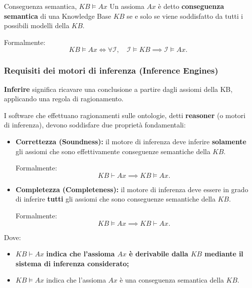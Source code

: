 \begin{definition}{Conseguenza semantica, $KB \models Ax$ }
    Un assioma $Ax$ è detto \textbf{conseguenza semantica} di una
    Knowledge Base $KB$ se e solo se viene soddisfatto da tutti
    i possibili modelli della $KB$.

    Formalmente:
    \[
        KB \models Ax
        \iff
        \forall \mathcal{I}, \quad
        \mathcal{I} \models KB
        \implies
        \mathcal{I} \models Ax.
    \]
\end{definition}


\newpage
\subsubsection{Requisiti dei motori di inferenza (Inference Engines)}

\begin{observation}{}
\textbf{Inferire} significa ricavare una conclusione a partire dagli assiomi della KB, applicando una
regola di ragionamento.
\end{observation}

I software che effettuano ragionamenti sulle ontologie, detti
\textbf{reasoner} (o motori di inferenza), devono soddisfare due
proprietà fondamentali:

\begin{itemize}
    \item \textbf{Correttezza (Soundness):} il motore di inferenza
    deve inferire \textbf{solamente} gli assiomi che sono
    effettivamente conseguenze semantiche della $KB$.

    Formalmente:
    \[
        KB \vdash Ax \implies KB \models Ax.
    \]

    \item \textbf{Completezza (Completeness):} il motore di inferenza
    deve essere in grado di inferire \textbf{tutti} gli assiomi
    che sono conseguenze semantiche della $KB$.

    Formalmente:
    \[
        KB \models Ax \implies KB \vdash Ax.
    \]
\end{itemize}

Dove:
\begin{itemize}
    \item $KB \vdash Ax$ \textbf{indica che l'assioma $Ax$ è derivabile
    dalla $KB$ mediante il sistema di inferenza considerato;}
    \item $KB \models Ax$ indica che l'assioma $Ax$ è una
    conseguenza semantica della $KB$.
\end{itemize}

